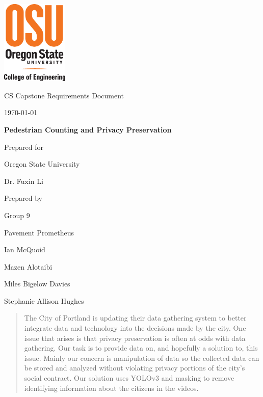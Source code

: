 \documentclass[onecolumn, draftclsnofoot,10pt, compsoc]{IEEEtran}
\def \CapstoneTeamName{		Pavement Prometheus}
\def \CapstoneTeamNumber{		9}
\def \GroupMemberOne{			Ian McQuoid  }
\def \GroupMemberTwo{			Mazen Alotaibi }
\def \GroupMemberThree{			Miles Bigelow Davies  }
\def \GroupMemberFour{			Stephanie Allison Hughes }
\def \CapstoneProjectName{		Pedestrian Counting and Privacy Preservation}
\def \CapstoneSponsorCompany{	Oregon State University}
\def \CapstoneSponsorPerson{		Dr. Fuxin Li}
\def \DocType{		%
				Requirements Document
				}
\newcommand{\NameSigPair}[1]{\par
\makebox[2.75in][r]{#1} \hfil 	\makebox[3.25in]{\makebox[2.25in]{\hrulefill} \hfill		\makebox[.75in]{\hrulefill}}
\par\vspace{-12pt} \textit{\tiny\noindent
\makebox[2.75in]{} \hfil		\makebox[3.25in]{\makebox[2.25in][r]{Signature} \hfill	\makebox[.75in][r]{Date}}}}
\renewcommand{\NameSigPair}[1]{#1}
\begin{document}
\begin{titlepage}
    \begin{singlespace}
    	\includegraphics[height=4cm]{images/coe_v_spot1}
        \hfill 
        \par\vspace{.2in}
        \centering
        \scshape{
            \huge CS Capstone \DocType \par
            {\large\today}\par
            \vspace{.5in}
            \textbf{\Huge\CapstoneProjectName}\par
            {\large Prepared for}\par
            \Huge \CapstoneSponsorCompany\par
            \vspace{5pt}
            {\Large\NameSigPair{\CapstoneSponsorPerson}\par}
            {\large Prepared by }\par
            Group\CapstoneTeamNumber\par
            \CapstoneTeamName\par 
            \vspace{5pt}
            {\Large
                \NameSigPair{\GroupMemberOne}\par
                \NameSigPair{\GroupMemberTwo}\par
                \NameSigPair{\GroupMemberThree}\par
                \NameSigPair{\GroupMemberFour}\par
            }
            \vspace{20pt}
        }
        \begin{abstract}
        The City of Portland is updating their data gathering system to better integrate data and technology into the decisions made by the city. One issue that arises is that privacy preservation is often at odds with data gathering. Our task is to provide data on, and hopefully a solution to, this issue. Mainly our concern is manipulation of data so the collected data can be stored and analyzed without violating privacy portions of the city's social contract. Our solution uses YOLOv3 and masking to remove identifying information about the citizens in the videos.
        \end{abstract}     
    \end{singlespace}
\end{titlepage}
\end{document}
